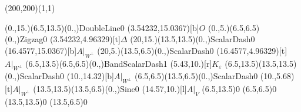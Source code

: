 \unitlength=1bp%

\begin{feynartspicture}(200,200)(1,1)

\FADiagram{}
\FAProp(0.,15.)(6.5,13.5)(0.,){DoubleLine}{0}
\FALabel(3.54232,15.0367)[b]{$O$}
\FAProp(0.,5.)(6.5,6.5)(0.,){Zigzag}{0}
\FALabel(3.54232,4.96329)[t]{$\Delta$}
\FAProp(20,15.)(13.5,13.5)(0.,){ScalarDash}{0}
\FALabel(16.4577,15.0367)[b]{$A|_{W^\perp}$}
\FAProp(20,5.)(13.5,6.5)(0.,){ScalarDash}{0}
\FALabel(16.4577,4.96329)[t]{$A|_{W^\perp}$}
\FAProp(6.5,13.5)(6.5,6.5)(0.,){BandScalarDash}{1}
\FALabel(5.43,10.)[r]{$K_\varepsilon$}
\FAProp(6.5,13.5)(13.5,13.5)(0.,){ScalarDash}{0}
\FALabel(10.,14.32)[b]{$A|_{W^\perp}$}
\FAProp(6.5,6.5)(13.5,6.5)(0.,){ScalarDash}{0}
\FALabel(10.,5.68)[t]{$A|_{W^\perp}$}
\FAProp(13.5,13.5)(13.5,6.5)(0.,){Sine}{0}
\FALabel(14.57,10.)[l]{$A|_V$}
\FAVert(6.5,13.5){0}
\FAVert(6.5,6.5){0}
\FAVert(13.5,13.5){0}
\FAVert(13.5,6.5){0}
\end{feynartspicture}

